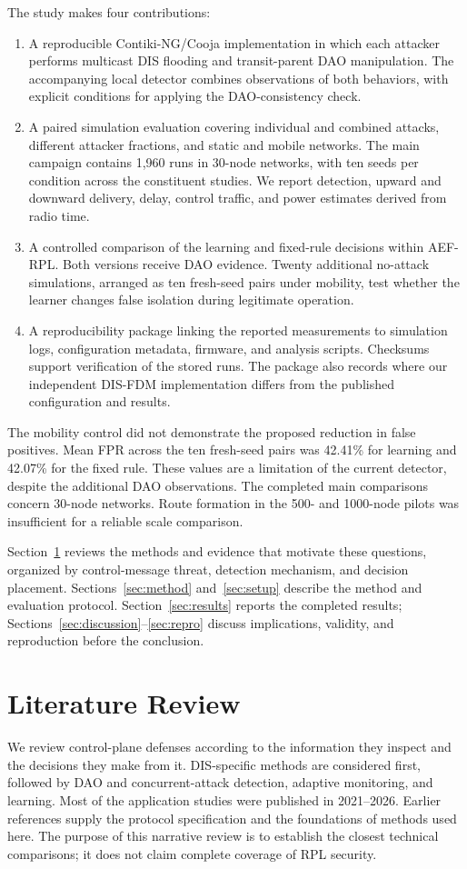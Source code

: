 The study makes four contributions:
\begin{enumerate}
\item A reproducible Contiki-NG/Cooja implementation in which each attacker performs multicast DIS flooding and transit-parent DAO manipulation. The accompanying local detector combines observations of both behaviors, with explicit conditions for applying the DAO-consistency check.
\item A paired simulation evaluation covering individual and combined attacks, different attacker fractions, and static and mobile networks. The main campaign contains 1,960 runs in 30-node networks, with ten seeds per condition across the constituent studies. We report detection, upward and downward delivery, delay, control traffic, and power estimates derived from radio time.
\item A controlled comparison of the learning and fixed-rule decisions within AEF-RPL. Both versions receive DAO evidence. Twenty additional no-attack simulations, arranged as ten fresh-seed pairs under mobility, test whether the learner changes false isolation during legitimate operation.
\item A reproducibility package linking the reported measurements to simulation logs, configuration metadata, firmware, and analysis scripts. Checksums support verification of the stored runs. The package also records where our independent DIS-FDM implementation differs from the published configuration and results.
\end{enumerate}

The mobility control did not demonstrate the proposed reduction in false positives. Mean FPR across the ten fresh-seed pairs was 42.41\% for learning and 42.07\% for the fixed rule. These values are a limitation of the current detector, despite the additional DAO observations. The completed main comparisons concern 30-node networks. Route formation in the 500- and 1000-node pilots was insufficient for a reliable scale comparison.

Section~\ref{sec:related} reviews the methods and evidence that motivate these questions, organized by control-message threat, detection mechanism, and decision placement. Sections~\ref{sec:method} and~\ref{sec:setup} describe the method and evaluation protocol. Section~\ref{sec:results} reports the completed results; Sections~\ref{sec:discussion}--\ref{sec:repro} discuss implications, validity, and reproduction before the conclusion.

\section{Literature Review}\label{sec:related}
We review control-plane defenses according to the information they inspect and the decisions they make from it. DIS-specific methods are considered first, followed by DAO and concurrent-attack detection, adaptive monitoring, and learning. Most of the application studies were published in 2021--2026. Earlier references supply the protocol specification and the foundations of methods used here. The purpose of this narrative review is to establish the closest technical comparisons; it does not claim complete coverage of RPL security.

